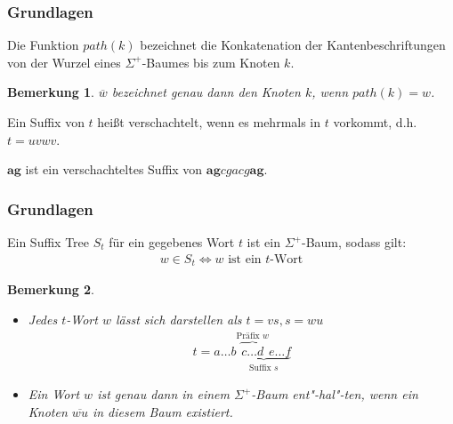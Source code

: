 \documentclass{beamer}
\newtheorem{remark}{Bemerkung}
\begin{document}
\begin{frame}
\frametitle{Grundlagen}
\begin{definition}[Pfad]
Die Funktion $path(k)$ bezeichnet die Konkatenation der Kantenbeschriftungen von der Wurzel eines $\Sigma^+$-Baumes bis zum Knoten $k$.
\begin{remark}
$\overline{w}$ bezeichnet genau dann den Knoten $k$, wenn $path(k) = w$.
\end{remark}
\end{definition}
\begin{definition}
Ein Suffix von $t$ heißt verschachtelt, wenn es mehrmals in $t$ vorkommt, d.h. $t = uvwv$.
\end{definition}
\begin{example}
$\boldsymbol{ag}$ ist ein verschachteltes Suffix von $\boldsymbol{ag}cgacg\boldsymbol{ag}$.
\end{example}
\end{frame}

\begin{frame}
\frametitle{Grundlagen}
\begin{definition}
Ein Suffix Tree $S_t$ für ein gegebenes Wort $t$ ist ein $\Sigma^+$-Baum, sodass gilt:
\begin{gather*}
    w \in S_t  \Longleftrightarrow w \text{ ist ein }t\text{-Wort}
\end{gather*}
\end{definition}
\vspace{-4mm}
\begin{remark}
\begin{itemize}
    \item Jedes $t$-Wort $w$ lässt sich darstellen als $t = vs, s = wu$
          \begin{gather*}
              t = a \dots b \underbrace{\overbrace{c \dots d}^{\text{Präfix }w} e \dots f}_{\text{Suffix }s}
          \end{gather*}
    \item Ein Wort $w$ ist genau dann in einem $\Sigma^+$-Baum ent"-hal"-ten, wenn ein Knoten $\overline{wu}$ in diesem Baum existiert.
\end{itemize}
\end{remark}
\end{frame}
\end{document}
